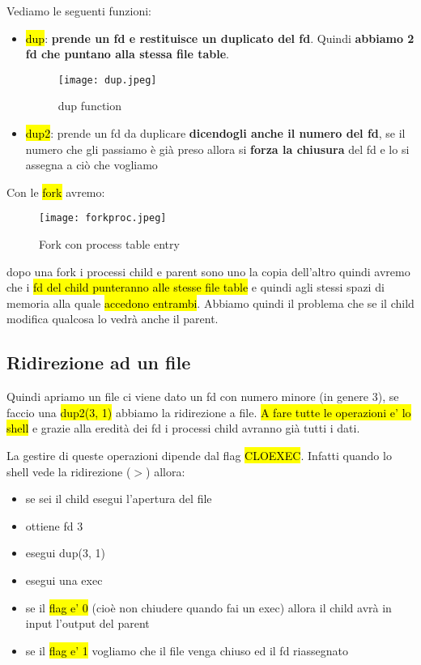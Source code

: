 Vediamo le seguenti funzioni:

\begin{itemize}
	\item \hl{dup}: \textbf{prende un fd e restituisce un duplicato del fd}. Quindi \textbf{abbiamo 2 fd che puntano alla stessa file table}.

	\begin{figure}[H]
	\centering
	\texttt{[image: dup.jpeg]}
	\caption{dup function} 
	\label{dup}
	\end{figure}


	\item \hl{dup2}: prende un fd da duplicare \textbf{dicendogli anche il numero del fd}, se il numero che gli passiamo è già preso allora si \textbf{forza la chiusura} del fd e lo si assegna a ciò che vogliamo

\end{itemize}


Con le \hl{fork} avremo:


\begin{figure}[H]
\centering
\texttt{[image: forkproc.jpeg]}
\caption{Fork con process table entry} 
\label{forkproc}
\end{figure}


dopo una fork i processi child e parent sono uno la copia dell'altro quindi avremo che i \hl{fd del child punteranno alle stesse file table} e quindi agli stessi spazi di memoria alla quale \hl{accedono entrambi}. Abbiamo quindi il problema che se il child modifica qualcosa lo vedrà anche il parent.


\subsection{Ridirezione ad un file}

Quindi apriamo un file ci viene dato un fd con numero minore (in genere 3), se faccio una \hl{dup2(3, 1)} abbiamo la ridirezione a file. \hl{A fare tutte le operazioni e' lo shell} e grazie alla eredità dei fd i processi child avranno già tutti i dati.

La gestire di queste operazioni dipende dal flag \hl{CLOEXEC}. Infatti quando lo shell vede la ridirezione ($>$) allora:

\begin{itemize}
	\item se sei il child esegui l'apertura del file
	\item ottiene fd 3
	\item esegui dup(3, 1)
	\item esegui una exec
	\item se il \hl{flag e' 0} (cioè non chiudere quando fai un exec) allora il child avrà in input l'output del parent
	\item se il \hl{flag e' 1} vogliamo che il file venga chiuso ed il fd riassegnato
\end{itemize}


